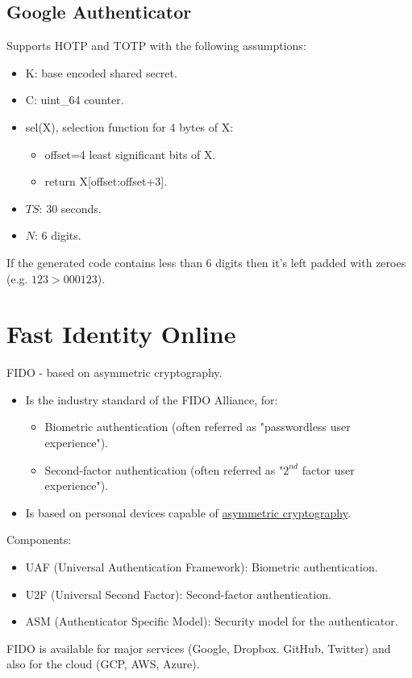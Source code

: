 \subsection{Google Authenticator}
Supports HOTP and TOTP with the following assumptions:
\begin{itemize}
    \item K: base encoded shared secret.
    \item C: uint\_64 counter.
    \item sel(X), selection function for 4 bytes of X:
    \begin{itemize}
        \item offset=4 least significant bits of X.
        \item return X[offset:offset+3].
    \end{itemize}
    \item $TS$: 30 seconds.
    \item $N$: 6 digits.
\end{itemize}
If the generated code contains less than 6 digits then it's left padded with zeroes (e.g. $123 > 000123$).
\section{Fast Identity Online}
\begin{center}
    FIDO - based on asymmetric cryptography.
\end{center}
\begin{itemize}
    \item Is the industry standard of the FIDO Alliance, for:
    \begin{itemize}
        \item Biometric authentication (often referred as "passwordless user experience").
        \item Second-factor authentication (often referred as "$2^{nd}$ factor user experience").
    \end{itemize}
    \item Is based on personal devices capable of \underline{asymmetric cryptography}.
\end{itemize}
Components:
\begin{itemize}
    \item UAF (Universal Authentication Framework): Biometric authentication.
    \item U2F (Universal Second Factor): Second-factor authentication.
    \item ASM (Authenticator Specific Model): Security model for the authenticator.
\end{itemize}
FIDO is available for major services (Google, Dropbox. GitHub, Twitter) and also for the cloud (GCP, AWS, Azure).

